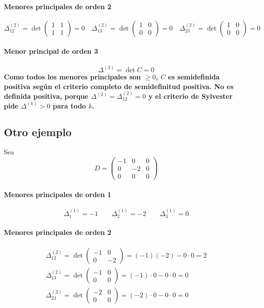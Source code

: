 \documentclass{article}
\begin{document}
\paragraph*{Menores principales de orden 2}
\[
\Delta^{(2)}_{12}=\det\begin{pmatrix}1&1\\1&1\end{pmatrix}=0\quad
\Delta^{(2)}_{13}=\det\begin{pmatrix}1&0\\0&0\end{pmatrix}=0\quad
\Delta^{(2)}_{23}=\det\begin{pmatrix}1&0\\0&0\end{pmatrix}=0
\]

\paragraph*{Menor principal de orden 3}
\[
\Delta^{(3)}=\det C=0
\]
\textbf{\color{teal}Como todos los menores principales son \(\ge0\), \(C\) es semidefinida positiva según el criterio completo de semidefinitud positiva. No es definida positiva, porque \(\Delta^{(2)}=\Delta^{(2)}_{12}=0\) y el criterio de Sylvester pide \(\Delta^{(k)}>0\) para todo \(k\).}

\subsection*{Otro ejemplo}

Sea
\[
D=\begin{pmatrix}
-1&0&0\\
0&-2&0\\
0&0&0
\end{pmatrix}
\]

\paragraph*{Menores principales de orden 1}
\[
\Delta^{(1)}_1=-1\qquad\Delta^{(1)}_2=-2\qquad\Delta^{(1)}_3=0
\]

\paragraph*{Menores principales de orden 2}
\[
\begin{gathered}
\Delta^{(2)}_{12}=\det\begin{pmatrix}-1&0\\0&-2\end{pmatrix}=(-1)(-2)-0\cdot0=2\\
\Delta^{(2)}_{13}=\det\begin{pmatrix}-1&0\\0&0\end{pmatrix}=(-1)\cdot0-0\cdot0=0\\
\Delta^{(2)}_{23}=\det\begin{pmatrix}-2&0\\0&0\end{pmatrix}=(-2)\cdot0-0\cdot0=0
\end{gathered}
\]
\end{document}
